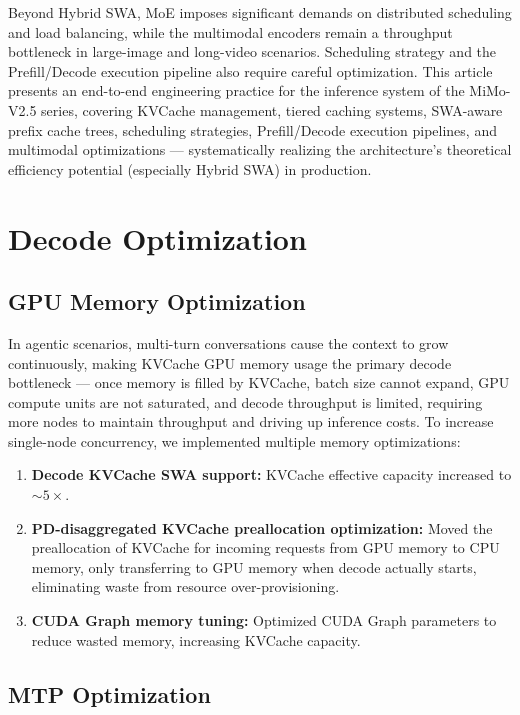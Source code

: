 Beyond Hybrid SWA, MoE imposes significant demands on distributed scheduling and load balancing, while the multimodal encoders remain a throughput bottleneck in large-image and long-video scenarios. Scheduling strategy and the Prefill/Decode execution pipeline also require careful optimization. This article presents an end-to-end engineering practice for the inference system of the MiMo-V2.5 series, covering KVCache management, tiered caching systems, SWA-aware prefix cache trees, scheduling strategies, Prefill/Decode execution pipelines, and multimodal optimizations — systematically realizing the architecture's theoretical efficiency potential (especially Hybrid SWA) in production.
\section{Decode Optimization}

\subsection{GPU Memory Optimization}

In agentic scenarios, multi-turn conversations cause the context to grow continuously, making KVCache GPU memory usage the primary decode bottleneck --- once memory is filled by KVCache, batch size cannot expand, GPU compute units are not saturated, and decode throughput is limited, requiring more nodes to maintain throughput and driving up inference costs. To increase single-node concurrency, we implemented multiple memory optimizations:

\begin{enumerate}
    \item \textbf{Decode KVCache SWA support:} KVCache effective capacity increased to \textbf{${\sim}5\times$}.
    \item \textbf{PD-disaggregated KVCache preallocation optimization:} Moved the preallocation of KVCache for incoming requests from GPU memory to CPU memory, only transferring to GPU memory when decode actually starts, eliminating waste from resource over-provisioning.
    \item \textbf{CUDA Graph memory tuning:} Optimized CUDA Graph parameters to reduce wasted memory, increasing KVCache capacity.
\end{enumerate}

\subsection{MTP Optimization}

